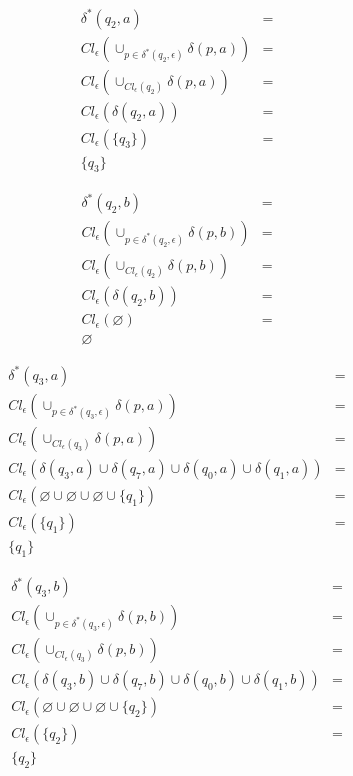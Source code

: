 \documentclass{article}
\begin{document}
\begin{enumerate}
{\begin{enumerate}
{					\begin{align*}
					\delta^{*} (q_{2},a)&=\\
					Cl_{\epsilon} (\cup_{p \in \delta^{*} (q_{2}, \epsilon)}	\delta (p,a)) &=\\
					Cl_{\epsilon} (\cup_{Cl_{\epsilon} (q_{2})}	\delta (p,a)) &=\\
					Cl_{\epsilon} ( \delta(q_{2},a)) &=\\
					Cl_{\epsilon} (\{q_{3}\}) &=\\
					\{q_{3}\}
					\end{align*}
					
					\begin{align*}
					\delta^{*} (q_{2},b)&=\\
					Cl_{\epsilon} (\cup_{p \in \delta^{*} (q_{2}, \epsilon)}	\delta (p,b)) &=\\
					Cl_{\epsilon} (\cup_{Cl_{\epsilon} (q_{2})}	\delta (p,b)) &=\\
					Cl_{\epsilon} ( \delta(q_{2},b)) &=\\
					Cl_{\epsilon} (\varnothing) &=\\
					\varnothing
					\end{align*}
					
					\begin{align*}
					\delta^{*} (q_{3},a)&=\\
					Cl_{\epsilon} (\cup_{p \in \delta^{*} (q_{3}, \epsilon)}	\delta (p,a)) &=\\
					Cl_{\epsilon} (\cup_{Cl_{\epsilon} (q_{3})}	\delta (p,a)) &=\\
					Cl_{\epsilon} ( \delta(q_{3},a) \cup \delta(q_{7},a) \cup \delta(q_{0},a) \cup \delta(q_{1},a)) &=\\
					Cl_{\epsilon} ( \varnothing \cup \varnothing \cup \varnothing \cup \{q_{1}\}) &=\\
					Cl_{\epsilon} (\{q_{1}\}) &=\\
					\{q_{1}\}
					\end{align*}
					
					\begin{align*}
					\delta^{*} (q_{3},b)&=\\
					Cl_{\epsilon} (\cup_{p \in \delta^{*} (q_{3}, \epsilon)}	\delta (p,b)) &=\\
					Cl_{\epsilon} (\cup_{Cl_{\epsilon} (q_{3})}	\delta (p,b)) &=\\
					Cl_{\epsilon} ( \delta(q_{3},b) \cup \delta(q_{7},b) \cup \delta(q_{0},b) \cup \delta(q_{1},b)) &=\\
					Cl_{\epsilon} ( \varnothing \cup \varnothing \cup \varnothing \cup \{q_{2}\}) &=\\
					Cl_{\epsilon} (\{q_{2}\}) &=\\
					\{q_{2}\}
					\end{align*}
					
}
\end{enumerate}}
\end{enumerate}
\end{document}
